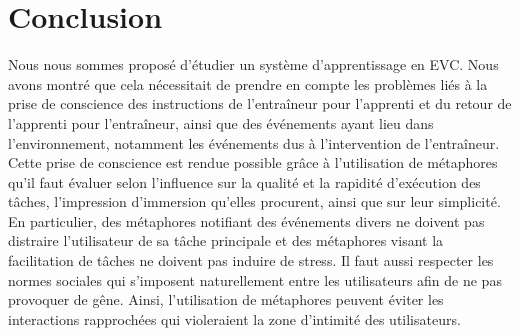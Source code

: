\documentclass[11pt]{article}
\begin{document}
\begin{comment}
For the first type of actions, The same metaphors than for the collaboration tasks can be used. For the second type, four metaphors can be evaluated:
\begin{enumerate}
	\item The coach avatar casts a spell using a specific gesture and voice control. Such a multimodal command can be real, i.e the coach has to perform it in order to make a parameter change, or just a metaphor, i.e the coach doesn't perform it but his avatar moves and speaks automatically.
	\item A 3D animation is performed by the system. For example, a grey cloud can appear and move through the scene in order to indicate that the weather is now rainy.
	\item A popup indicating the change is displayed.
	\item No indication at all.
\end{enumerate}

Several perception aspects can be evaluated thanks to these tests: the annoyance and pleasant degrees and the execution time (some metaphors can capture the attention of the trainee for a quite long time).
\end{comment}

\section{Conclusion}

Nous nous sommes proposé d'étudier un système d'apprentissage en EVC. Nous avons montré que cela nécessitait de prendre en compte les problèmes liés à la prise de conscience des instructions de l'entraîneur pour l'apprenti et du retour de l'apprenti pour l'entraîneur, ainsi que des événements ayant lieu dans l'environnement, notamment les événements dus à l'intervention de l'entraîneur. Cette prise de conscience est rendue possible grâce à l'utilisation de métaphores qu'il faut évaluer selon l'influence sur la qualité et la rapidité d'exécution des tâches, l'impression d'immersion qu'elles procurent, ainsi que sur leur simplicité. En particulier, des métaphores notifiant des événements divers ne doivent pas distraire l'utilisateur de sa tâche principale et des métaphores visant la facilitation de tâches ne doivent pas induire de stress. Il faut aussi respecter les normes sociales qui s'imposent naturellement entre les utilisateurs afin de ne pas provoquer de gêne. Ainsi, l'utilisation de métaphores peuvent éviter les interactions rapprochées qui violeraient la zone d'intimité des utilisateurs.
\\
\end{document}

